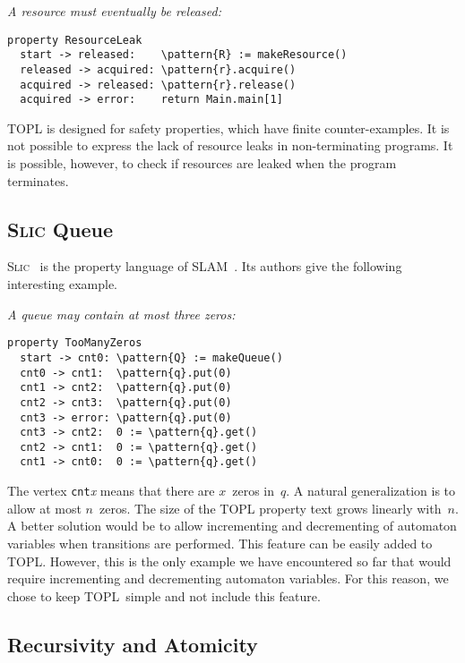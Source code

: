 \documentclass[preprint]{sigplanconf} %
\newcommand{\TPL}{TOPL}
\newcommand{\delimitVerbatim}{\par\nobreak\smallskip\noindent}
\newcommand{\pattern}[1]{\ensuremath{\mathtt{\underline{#1}}}}
\theoremstyle{definition}
\theoremstyle{remark}
\begin{document}
\medskip\emph{A resource must eventually be released:}
\delimitVerbatim
\begin{Verbatim}[commandchars=\\\{\}]
property ResourceLeak
  start -> released:    \pattern{R} := makeResource()
  released -> acquired: \pattern{r}.acquire()
  acquired -> released: \pattern{r}.release()
  acquired -> error:    return Main.main[1]
\end{Verbatim}
\delimitVerbatim
TOPL is designed for safety properties, which have finite counter-examples.
It is not possible to express the lack of resource leaks in non-terminating programs.
It is possible, however, to check if resources are leaked when the program terminates.

\subsection{\textsc{Slic} Queue} %

\textsc{Slic}~\cite{ball2002} is the property language of SLAM~\cite{dblp:conf/cav/ballr01}.
Its authors give the following interesting example.

\medskip\emph{A queue may contain at most three zeros:}
\delimitVerbatim
\begin{Verbatim}[commandchars=\\\{\}]
property TooManyZeros
  start -> cnt0: \pattern{Q} := makeQueue()
  cnt0 -> cnt1:  \pattern{q}.put(0)
  cnt1 -> cnt2:  \pattern{q}.put(0)
  cnt2 -> cnt3:  \pattern{q}.put(0)
  cnt3 -> error: \pattern{q}.put(0)
  cnt3 -> cnt2:  0 := \pattern{q}.get()
  cnt2 -> cnt1:  0 := \pattern{q}.get()
  cnt1 -> cnt0:  0 := \pattern{q}.get()
\end{Verbatim}
\delimitVerbatim
The vertex \texttt{cnt}\textit{x} means that there are $x$~zeros in~$q$.
A natural generalization is to allow at most $n$~zeros.
The size of the TOPL property text grows linearly with~$n$.
A better solution would be to allow incrementing and decrementing of automaton variables when transitions are performed.
This feature can be easily added to TOPL\null.
However, this is the only example we have encountered so far that would require incrementing and decrementing automaton variables.
For this reason, we chose to keep \TPL \ simple and not include this feature.

\subsection{Recursivity and Atomicity}\label{sec:examples.ho} %
\end{document}
